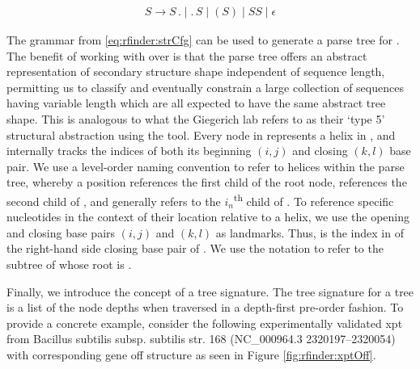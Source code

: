 \begin{align}
\label{eq:rfinder:strCfg}
S \rightarrow S\,.\;|\;.\,S\;|\;(S)\;|\;SS\;|\;\epsilon
\end{align}

The grammar from \eqref{eq:rfinder:strCfg} can be used to generate a parse tree
\tree for \strS. The benefit of working with \tree over \strS is that the parse
tree offers an abstract representation of secondary structure shape independent of
sequence length, permitting us to classify and eventually constrain a large
collection of sequences having variable length which are all expected to have the
same abstract tree shape. This is analogous to what the Giegerich lab refers to as
their `type 5' structural abstraction using the \rshapes tool. Every node in \tree
represents a helix in \strS, and internally tracks the indices of both its
beginning $(i,j)$ and closing $(k,l)$ base pair. We use a level-order naming
convention to refer to helices within the parse tree, whereby a position
 references the first child of the root node, 
references the second child of , and generally
 refers to the $i_n$\textsuperscript{th} child of
. To reference specific nucleotides in the
context of their location relative to a helix, we use the opening and closing base
pairs $(i,j)$ and $(k,l)$ as landmarks. Thus,  is the index in
\strS of the right-hand side closing base pair of . We use the
notation  to refer to the subtree of \tree whose root is
.

Finally, we introduce the concept of a tree signature. The tree signature for a
tree \tree is a list of the node depths when traversed in a depth-first pre-order
fashion. To provide a concrete example, consider the following experimentally
validated xpt \grb from Bacillus subtilis subsp. subtilis str. 168
(NC\_000964.3 2320197--2320054) with corresponding gene off structure as seen in
Figure \ref{fig:rfinder:xptOff}.
\medskip

